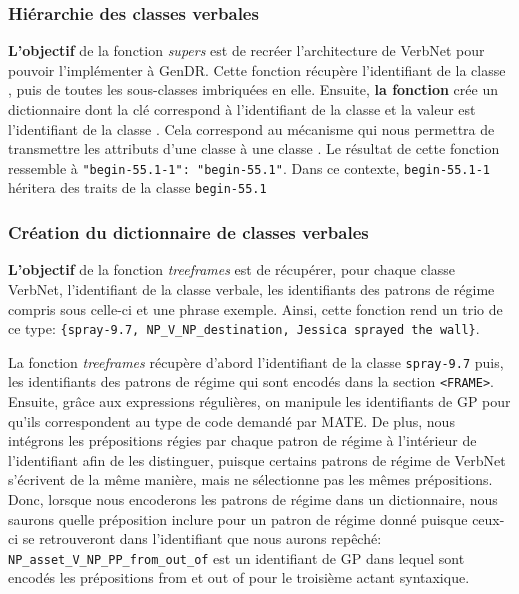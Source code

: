 \subsubsection{Hiérarchie des classes verbales}

\textbf{L'objectif} de la fonction \emph{supers} est de recréer l'architecture de VerbNet pour pouvoir l'implémenter à GenDR. Cette fonction récupère l'identifiant de la classe , puis de toutes les sous-classes imbriquées en elle. Ensuite, \textbf{la fonction} crée un dictionnaire dont la clé correspond à l'identifiant de la classe  et la valeur est l'identifiant de la classe . Cela correspond au mécanisme qui nous permettra de transmettre les attributs d'une classe  à une classe . Le résultat de cette fonction ressemble à \lstinline|"begin-55.1-1": "begin-55.1"|. Dans ce contexte, \texttt{begin-55.1-1} héritera des traits de la classe \texttt{begin-55.1}

\subsubsection{Création du dictionnaire de classes verbales}

\textbf{L'objectif} de la fonction \emph{treeframes} est de récupérer, pour chaque classe VerbNet, l'identifiant de la classe verbale, les identifiants des patrons de régime compris sous celle-ci et une phrase exemple. Ainsi, cette fonction rend un trio de ce type: \lstinline|{spray-9.7, NP_V_NP_destination, Jessica sprayed the wall}|.

La fonction \emph{treeframes} récupère d'abord l'identifiant de la classe \texttt{spray-9.7} puis, les identifiants des patrons de régime qui sont encodés dans la section \texttt{<FRAME>}. Ensuite, grâce aux expressions régulières, on manipule les identifiants de \ac{GP} pour qu'ils correspondent au type de code demandé par MATE. De plus, nous intégrons les prépositions régies par chaque patron de régime à l'intérieur de l'identifiant afin de les distinguer, puisque certains patrons de régime de VerbNet s'écrivent de la même manière, mais ne sélectionne pas les mêmes prépositions. Donc, lorsque nous encoderons les patrons de régime dans un dictionnaire, nous saurons quelle préposition inclure pour un patron de régime donné puisque ceux-ci se retrouveront dans l'identifiant que nous aurons repêché: \texttt{NP\_asset\_V\_NP\_PP\_from\_out\_of} est un identifiant de \ac{GP} dans lequel sont encodés les prépositions from et out of pour le troisième actant syntaxique.  

